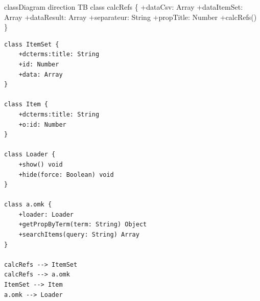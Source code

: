 \documentclass[
  letterpaper,
  DIV=11,
  numbers=noendperiod]{scrartcl}
\author{}
\date{}
\renewcommand*\contentsname{Table of contents}
\newcommand\contentsname{Table of contents}
\begin{document}
\renewcommand*\contentsname{Table of contents}
{
\hypersetup{linkcolor=}
\setcounter{tocdepth}{3}
\tableofcontents
}

classDiagram direction TB class calcRefs \{ +dataCsv: Array
+dataItemSet: Array +dataResult: Array +separateur: String +propTitle:
Number +calcRefs() \}

\begin{verbatim}
class ItemSet {
    +dcterms:title: String
    +id: Number
    +data: Array
}

class Item {
    +dcterms:title: String
    +o:id: Number
}

class Loader {
    +show() void
    +hide(force: Boolean) void
}

class a.omk {
    +loader: Loader
    +getPropByTerm(term: String) Object
    +searchItems(query: String) Array
}

calcRefs --> ItemSet
calcRefs --> a.omk
ItemSet --> Item
a.omk --> Loader
\end{verbatim}
\end{document}
